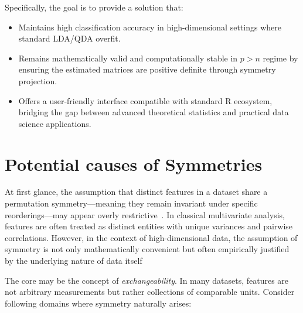 \documentclass[a4paper,11pt,twoside]{report}
\theoremstyle{definition}
\begin{document}
Specifically, the goal is to provide a solution that:
\begin{itemize}
    \item Maintains high classification accuracy in high-dimensional settings where standard LDA/QDA overfit.
    \item Remains mathematically valid and computationally stable in $p > n$ regime by ensuring the estimated matrices are positive definite through symmetry projection.
    \item Offers a user-friendly interface compatible with standard R ecosystem, bridging the gap between advanced theoretical statistics and practical data science applications.
\end{itemize}

\section{Potential causes of Symmetries}
\label{sec:symmetry}

At first glance, the assumption that distinct features in a dataset share a permutation symmetry—meaning they remain invariant under specific reorderings—may appear overly restrictive~\cite{andersson1998symmetry}. In classical multivariate analysis, features are often treated as distinct entities with unique variances and pairwise correlations. However, in the context of high-dimensional data, the assumption of symmetry is not only mathematically convenient but often empirically justified by the underlying nature of data itself

The core may be the concept of \textit{exchangeability}. In many datasets, features are not arbitrary measurements but rather collections of comparable units. Consider following domains where symmetry naturally arises:
\end{document}
